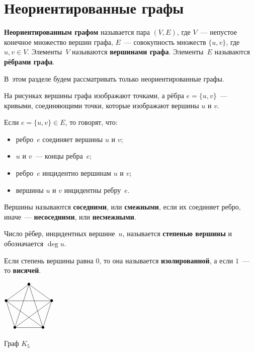 \section{Неориентированные графы}
 \textbf{Неориентированным графом} называется пара $(V, E)$, где $V$~--- непустое конечное множество вершин графа, $E$~--- совокупность множеств $\{ u, v \}$, где $u, v \in V$.
Элементы~$V$ называются \textbf{вершинами графа}.
Элементы~$E$ называются \textbf{рёбрами графа}.

В~этом разделе будем рассматривать только неориентированные графы.

На рисунках вершины графа изображают точками, а рёбра $e = \{ u, v \}$~--- кривыми, соединяющими точки, которые изображают вершины $u$ и $v$.

Если $e = \{ u, v \} \in E$, то говорят, что:
\begin{itemize}
	\item ребро~$e$ соединяет вершины $u$ и $v$;
	\item $u$ и $v$~--- концы ребра~$e$;
	\item ребро~$e$ инцидентно вершинам $u$ и $v$;
	\item вершины $u$ и $v$ инцидентны ребру~$e$.
\end{itemize}

Вершины называются \textbf{соседними}, или \textbf{смежными}, если их соединяет ребро, иначе~--- \textbf{несоседними}, или \textbf{несмежными}.

 Число рёбер, инцидентных вершине~$u$, называется \textbf{степенью вершины} и обозначается $\deg u$.

Если степень вершины равна $0$, то она называется \textbf{изолированной}, а если $1$~--- то \textbf{висячей}.

\begin{floatingfigure}[r]{30mm} \centering
\noindent
$\begin{xy} /r0.4mm/:
(30, 60) = "1" *{\bullet}; %
(58.532, 39.271) = "2" *{\bullet}; %
(47.634, 5.729) = "3" *{\bullet}; %
(12.366, 5.729) = "4" *{\bullet}; %
(1.468, 39.271) = "5" *{\bullet}; %
"5"; "1" **@{-}; "2" **@{-}; "3" **@{-}; "4" **@{-}; "5" **@{-};
"2" **@{-}; "4" **@{-}; "1" **@{-}; "3" **@{-}; "5" **@{-};
\end{xy}$
\caption{Граф $K_5$}
\end{floatingfigure}

